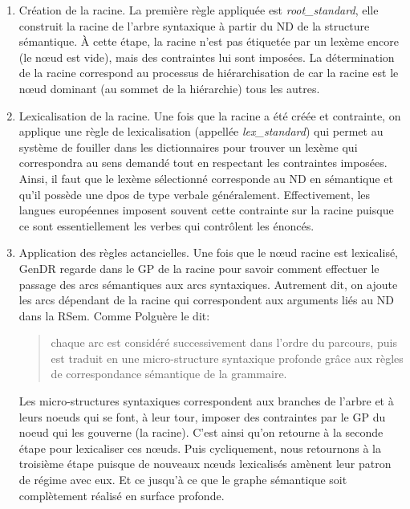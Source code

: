 \begin{enumerate}
  \item Création de la racine.
  La première règle appliquée est \emph{root\_standard}, elle construit la racine de l'arbre syntaxique à partir du \ac{ND} de la structure sémantique. À cette étape, la racine n'est pas étiquetée par un lexème encore (le n\oe{}ud est vide), mais des contraintes lui sont imposées. La détermination de la racine correspond au processus de hiérarchisation de \cite{PolguereStructurationmisejeu1990} car la racine est le n\oe{}ud dominant (au sommet de la hiérarchie) tous les autres.

  \item Lexicalisation de la racine.
  Une fois que la racine a été créée et contrainte, on applique une règle de lexicalisation (appellée \emph{lex\_standard}) qui permet au système de fouiller dans les dictionnaires pour trouver un lexème qui correspondra au sens demandé tout en respectant les contraintes imposées. Ainsi, il faut que le lexème sélectionné corresponde au \ac{ND} en sémantique et qu'il possède une \ac{dpos} de type verbale généralement. Effectivement, les langues européennes imposent souvent cette contrainte sur la racine puisque ce sont essentiellement les verbes qui contrôlent les énoncés.

  \item Application des règles actancielles.
  Une fois que le n\oe{}ud racine est lexicalisé, GenDR regarde dans le \ac{GP} de la racine pour savoir comment effectuer le passage des arcs sémantiques aux arcs syntaxiques. Autrement dit, on ajoute les arcs dépendant de la racine qui correspondent aux arguments liés au \ac{ND} dans la \ac{RSem}. Comme Polguère le dit:
\begin{quote}
chaque arc est considéré successivement dans l'ordre du parcours, puis est traduit en une micro-structure syntaxique profonde grâce aux règles de correspondance sémantique de la grammaire.
\end{quote}
\vspace{-\baselineskip}
\hfill
\cite[p.~273]{PolguereStructurationmisejeu1990}

Les micro-structures syntaxiques correspondent aux branches de l'arbre et à leurs noeuds qui se font, à leur tour, imposer des contraintes par le \ac{GP} du noeud qui les gouverne (la racine). C'est ainsi qu'on retourne à la seconde étape pour lexicaliser ces n\oe{}uds. Puis cycliquement, nous retournons à la troisième étape puisque de nouveaux n\oe{}uds lexicalisés amènent leur patron de régime avec eux. Et ce jusqu'à ce que le graphe sémantique soit complètement réalisé en surface profonde.
\end{enumerate} 

